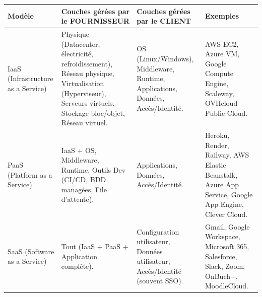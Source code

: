 \documentclass[11pt]{article}
\newcommand{\cle}[1]{{\popxbold\color{popdark}#1}}
\begin{document}
\begin{propriete}
\begin{center}
\begin{tabularx}{\linewidth}{|l|X|X|X|}
\hline
\rowcolor{poppurpleL}
\textbf{Modèle} & \textbf{Couches gérées par le FOURNISSEUR} & \textbf{Couches gérées par le CLIENT} & \textbf{Exemples} \\
\hline
\cle{IaaS} (Infrastructure as a Service) & Physique (Datacenter, électricité, refroidissement), Réseau physique, Virtualisation (Hyperviseur), Serveurs virtuels, Stockage bloc/objet, Réseau virtuel. & OS (Linux/Windows), Middleware, Runtime, Applications, Données, Accès/Identité. & AWS EC2, Azure VM, Google Compute Engine, Scaleway, OVHcloud Public Cloud. \\
\cle{PaaS} (Platform as a Service) & IaaS + OS, Middleware, Runtime, Outils Dev (CI/CD, BDD managées, File d'attente). & Applications, Données, Accès/Identité. & Heroku, Render, Railway, AWS Elastic Beanstalk, Azure App Service, Google App Engine, Clever Cloud. \\
\cle{SaaS} (Software as a Service) & Tout (IaaS + PaaS + Application complète). & Configuration utilisateur, Données utilisateur, Accès/Identité (souvent SSO). & Gmail, Google Workspace, Microsoft 365, Salesforce, Slack, Zoom, OnBuch+, MoodleCloud. \\
\hline
\end{tabularx}
\end{center}
\end{propriete}
\end{document}
